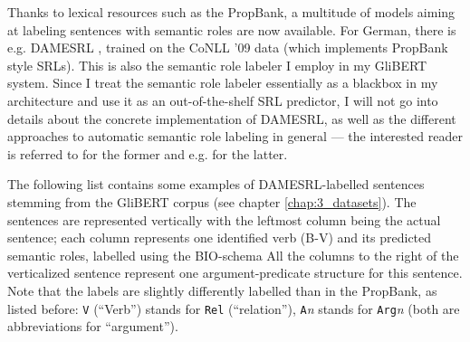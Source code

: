 


Thanks to lexical resources such as the PropBank, a multitude of models
aiming at labeling sentences with semantic roles are now available. For
German, there is e.g. DAMESRL \citep{do2018flexible}, trained on the CoNLL
'09 \citep{hajivc2009conll} data (which implements PropBank style SRLs).
This is also the semantic role labeler I employ in my GliBERT system.
Since I treat the semantic role labeler essentially as a blackbox in my
architecture and use it as an out-of-the-shelf SRL predictor, I will not go
into details about the concrete implementation of DAMESRL, as well as the
different approaches to automatic semantic role labeling in general ---
the interested reader is referred to \cite{do2018flexible} for the former
and e.g. \cite{palmer2010semantic} for the latter.

The following list contains some examples of DAMESRL-labelled sentences stemming from the
GliBERT corpus (see chapter \ref{chap:3_datasets}). The sentences are represented vertically
with the leftmost column being the actual sentence; each column represents one identified verb
(B-V) and its predicted semantic roles, labelled using the BIO-schema All the columns to the right of the verticalized sentence
represent one argument-predicate structure for this sentence. Note that the labels are slightly
differently labelled than in the PropBank, as listed before: \texttt{V} (``Verb'') stands for
\texttt{Rel} (``relation''), \texttt{A}\textit{n} stands for \texttt{Arg}\textit{n} (both are
abbreviations for ``argument'').

